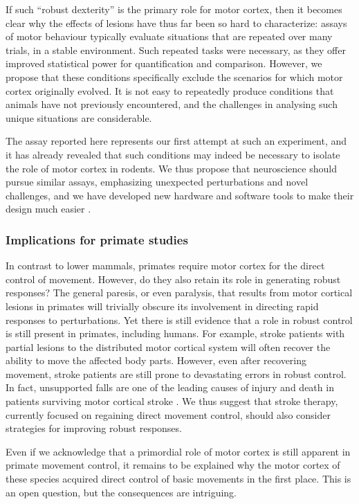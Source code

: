If such ``robust dexterity'' is the primary role for motor cortex, then it becomes clear why the effects of lesions have thus far been so hard to characterize: assays of motor behaviour typically evaluate situations that are repeated over many trials, in a stable environment. Such repeated tasks were necessary, as they offer improved statistical power for quantification and comparison. However, we propose that these conditions specifically exclude the scenarios for which motor cortex originally evolved. It is not easy to repeatedly produce conditions that animals have not previously encountered, and the challenges in analysing such unique situations are considerable.

The assay reported here represents our first attempt at such an experiment, and it has already revealed that such conditions may indeed be necessary to isolate the role of motor cortex in rodents. We thus propose that neuroscience should pursue similar assays, emphasizing unexpected perturbations and novel challenges, and we have developed new hardware and software tools to make their design much easier \cite{Lopes2015a}.

\subsubsection*{Implications for primate studies}

In contrast to lower mammals, primates require motor cortex for the direct control of movement. However, do they also retain its role in generating robust responses? The general paresis, or even paralysis, that results from motor cortical lesions in primates will trivially obscure its involvement in directing rapid responses to perturbations. Yet there is still evidence that a role in robust control is still present in primates, including humans. For example, stroke patients with partial lesions to the distributed motor cortical system will often recover the ability to move the affected body parts. However, even after recovering movement, stroke patients are still prone to devastating errors in robust control. In fact, unsupported falls are one of the leading causes of injury and death in patients surviving motor cortical stroke \cite{Jacobs2014}. We thus suggest that stroke therapy, currently focused on regaining direct movement control, should also consider strategies for improving robust responses.

Even if we acknowledge that a primordial role of motor cortex is still apparent in primate movement control, it remains to be explained why the motor cortex of these species acquired direct control of basic movements in the first place. This is an open question, but the consequences are intriguing.


